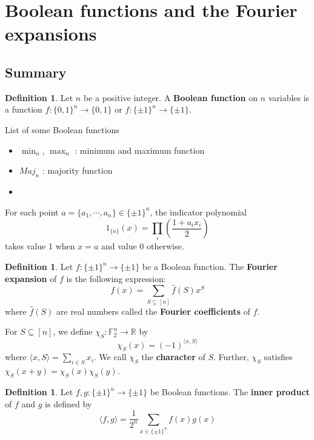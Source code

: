 \documentclass[11pt]{article}
\numberwithin{equation}{section}
\theoremstyle{definition}
\newtheorem{defn}[thm]{Definition}
\begin{document}
\setcounter{tocdepth}{5}

\tableofcontents

\clearpage

\section{Boolean functions and the Fourier expansions}

\subsection*{Summary}

\begin{defn}\label{defn:bool_func}
	Let $n$ be a positive integer. A \textbf{Boolean function} on $n$ variables is a function $f:\{0,1\}^n \to \{0,1\}$ or $f:\{\pm 1\}^n \to \{\pm 1\}$.
\end{defn}

List of some Boolean functions
\begin{itemize}
	\item $\min_n$, $\max_n$ : minimum and maximum function
	\item $Maj_n$ : majority function
	\item
\end{itemize}

For each point $a = \{a_1, \cdots, a_n\} \in \{\pm 1\}^n$, the indicator polynomial
$$1_{\{a\}}(x) = \prod_i \left(\frac{1+a_i x_i}{2}\right)$$
takes value 1 when $x=a$ and value 0 otherwise.

\begin{defn}\label{defn:fourier_expansion}
	Let $f:\{\pm 1\}^n \to \{\pm 1\}$ be a Boolean function. The \textbf{Fourier expansion} of $f$ is the following expression:
	$$f(x) = \sum_{S \subseteq [n]} \hat{f}(S) x^S$$
	where $\hat{f}(S)$ are real numbers called the \textbf{Fourier coefficients} of $f$.

	For $S \subseteq [n]$, we define $\chi_S: \mathbb{F}_2^n \rightarrow \mathbb{R}$ by
	$$\chi_S(x) = (-1)^{\langle x, S \rangle}$$
	where $\langle x, S \rangle = \sum_{i \in S} x_i$. We call $\chi_S$ the \textbf{character} of $S$.
	Further, $\chi_S$ satisfies $\chi_S(x+y) = \chi_S(x) \chi_S(y)$.
\end{defn}

\begin{defn}\label{defn:inner_prod}
	Let $f,g: \{\pm 1\}^n \to \{\pm 1\}$ be Boolean functions. The \textbf{inner product} of $f$ and $g$ is defined by
	$$\langle f, g \rangle = \frac{1}{2^n} \sum_{x \in \{\pm 1\}^n} f(x) g(x)$$
\end{defn}
\end{document}
